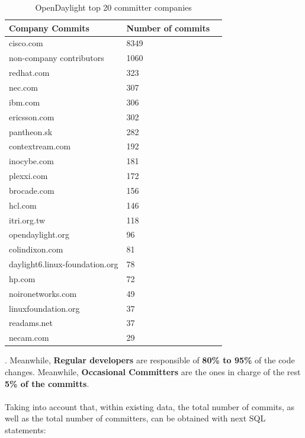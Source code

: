 \documentclass[a4paper, 12pt]{book}
\begin{document}
\begin{table}[H]
\footnotesize
\begin{center}
\begin{tabular}{|l|l|p{3cm}|}
\hline
\textbf{Company Commits} & \textbf{Number of commits} \\ \hline
cisco.com & 8349 \\ \hline
non-company contributors & 1060 \\ \hline
redhat.com & 323 \\ \hline
nec.com & 307 \\ \hline
ibm.com & 306 \\ \hline
ericsson.com & 302 \\ \hline
pantheon.sk & 282 \\ \hline
contextream.com & 192 \\ \hline
inocybe.com & 181 \\ \hline
plexxi.com & 172 \\ \hline
brocade.com & 156 \\ \hline
hcl.com & 146 \\ \hline
itri.org.tw & 118 \\ \hline
opendaylight.org & 96 \\ \hline
colindixon.com & 81 \\ \hline
daylight6.linux-foundation.org & 78 \\ \hline
hp.com & 72 \\ \hline
noironetworks.com & 49 \\ \hline
linuxfoundation.org & 37 \\ \hline
readams.net & 37 \\ \hline
necam.com & 29 \\ \hline
\end{tabular}
\end{center}
\caption{OpenDaylight top 20 committer companies}
\label{tab:odl_top_companies}
\end{table}
. Meanwhile, \textbf{Regular developers} are responsible of \textbf{80\% to 95\%} of the code changes. Meanwhile, \textbf{Occasional Committers} are the ones in charge of the rest \textbf{5\% of the committs}.\\
\\
Taking into account that, within existing data, the total number of commits, as well as the total number of committers, can be obtained with next SQL statements:
\end{document}
